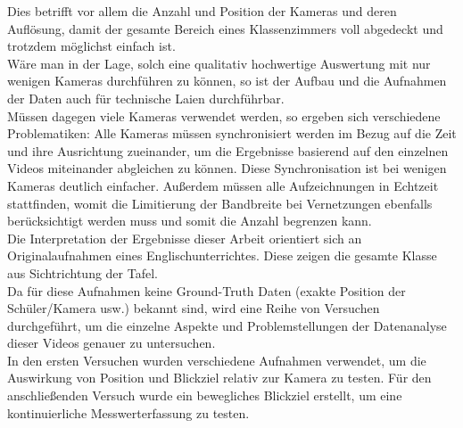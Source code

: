 Dies betrifft vor allem die Anzahl und Position der Kameras und deren Auflösung, damit der gesamte Bereich eines Klassenzimmers voll abgedeckt und trotzdem möglichst einfach ist.\\
Wäre man in der Lage, solch eine qualitativ hochwertige Auswertung mit nur wenigen Kameras durchführen zu können, so ist der Aufbau und die Aufnahmen der Daten auch für technische Laien durchführbar.\\
Müssen dagegen viele Kameras verwendet werden, so ergeben sich verschiedene Problematiken: Alle Kameras müssen synchronisiert werden im Bezug auf die Zeit und ihre Ausrichtung zueinander, um die Ergebnisse basierend auf den einzelnen Videos miteinander abgleichen zu können. Diese Synchronisation ist bei wenigen Kameras deutlich einfacher. Außerdem müssen alle Aufzeichnungen in Echtzeit stattfinden, womit die Limitierung der Bandbreite bei Vernetzungen ebenfalls berücksichtigt werden muss und somit die Anzahl begrenzen kann.\\
Die Interpretation der Ergebnisse dieser Arbeit orientiert sich an Originalaufnahmen eines Englischunterrichtes. Diese zeigen die gesamte Klasse aus Sichtrichtung der Tafel.\\
Da für diese Aufnahmen keine Ground-Truth Daten (exakte Position der Schüler/Kamera usw.) bekannt sind, wird eine Reihe von Versuchen durchgeführt, um die einzelne Aspekte und Problemstellungen der Datenanalyse dieser Videos genauer zu untersuchen.\\
In den ersten Versuchen wurden verschiedene Aufnahmen verwendet, um die Auswirkung von Position und Blickziel relativ zur Kamera zu testen. Für den anschließenden Versuch wurde ein bewegliches Blickziel erstellt, um eine kontinuierliche Messwerterfassung zu testen.